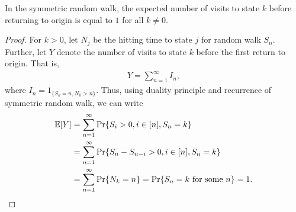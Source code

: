 \documentclass[a4paper,10pt,english]{article}
\begin{document}
\begin{prop}
In the symmetric random walk, the expected number of visits to state $k$ before returning to origin is equal to $1$ for all $k \neq 0$.
\end{prop}
\begin{proof}
For $k>0$, let $N_j$ be the hitting time to state $j$ for random walk $S_n$. Further, let $Y$ denote the number of visits to state $k$ before the first return to origin. That is, 
\begin{align*}Y = \sum_{n=1}^\infty I_n,\end{align*}
where $I_n = 1_{\{S_k = n, N_0 > n\}}$.
Thus, using duality principle and recurrence of symmetric random walk, we can write
\begin{align*}
\mathbb{E}[Y] &= \sum_{n=1}^\infty \Pr\{S_i > 0, i \in [n], S_n = k\}\\
&= \sum_{n=1}^\infty \Pr\{S_n - S_{n-i} > 0, i \in [n], S_n = k\}\\
&= \sum_{n=1}^\infty \Pr\{N_k = n\} = \Pr\{S_n = k \text{ for some }n\} = 1.
\end{align*}
\end{proof}
\end{document}
